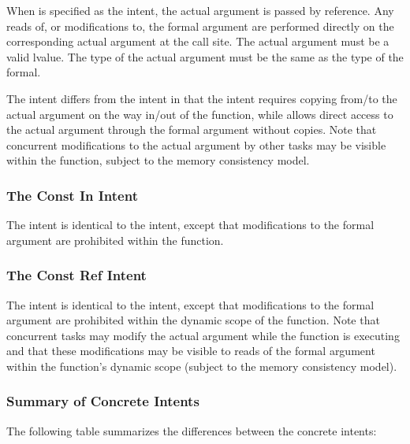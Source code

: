 When  is specified as the intent, the actual argument is
passed by reference.  Any reads of, or modifications to, the formal
argument are performed directly on the corresponding actual argument
at the call site.  The actual argument must be a valid lvalue.
The type of the actual argument must be the same
as the type of the formal.

The  intent differs from the  intent in that
the  intent requires copying from/to the actual argument on
the way in/out of the function, while  allows direct
access to the actual argument through the formal argument without
copies.  Note that concurrent modifications to the  actual argument by
other tasks may be visible within the function, subject to the memory
consistency model.


\subsubsection{The Const In Intent}
\label{The_Const_In_Intent}

The  intent is identical to the  intent,
except that modifications to the formal argument are prohibited within
the function.


\subsubsection{The Const Ref Intent}
\label{The_Const_Ref_Intent}

The  intent is identical to the  intent,
except that modifications to the formal argument are prohibited within
the dynamic scope of the function.  Note that concurrent tasks may
modify the actual argument while the function is executing and that
these modifications may be visible to reads of the formal argument
within the function's dynamic scope (subject to the memory consistency
model).

\subsubsection{Summary of Concrete Intents}
\label{Summary_of_Concrete_Intents}

The following table summarizes the differences between the concrete
intents:

